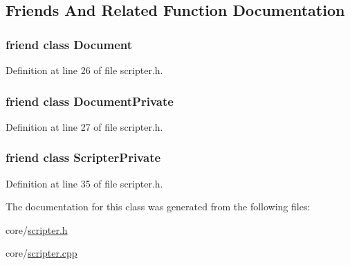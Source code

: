 \subsection{Friends And Related Function Documentation}
\hypertarget{classOkular_1_1Scripter_a883538034e58fc5c0de7d4e4cab3cef7}{
\subsubsection[{Document}]{\setlength{\rightskip}{0pt plus 5cm}friend class {\bf Document}\hspace{0.3cm}{\ttfamily [friend]}}}\label{classOkular_1_1Scripter_a883538034e58fc5c0de7d4e4cab3cef7}


Definition at line 26 of file scripter.\+h.

\hypertarget{classOkular_1_1Scripter_ad60d3d11afe13773e689a27dbaba5d11}{
\subsubsection[{Document\+Private}]{\setlength{\rightskip}{0pt plus 5cm}friend class {\bf Document\+Private}\hspace{0.3cm}{\ttfamily [friend]}}}\label{classOkular_1_1Scripter_ad60d3d11afe13773e689a27dbaba5d11}


Definition at line 27 of file scripter.\+h.

\hypertarget{classOkular_1_1Scripter_a016d502d2a5f11cbf0243d2376e9a1a4}{
\subsubsection[{Scripter\+Private}]{\setlength{\rightskip}{0pt plus 5cm}friend class {\bf Scripter\+Private}\hspace{0.3cm}{\ttfamily [friend]}}}\label{classOkular_1_1Scripter_a016d502d2a5f11cbf0243d2376e9a1a4}


Definition at line 35 of file scripter.\+h.



The documentation for this class was generated from the following files\+:\begin{DoxyCompactItemize}
\item 
core/\hyperlink{scripter_8h}{scripter.\+h}\item 
core/\hyperlink{scripter_8cpp}{scripter.\+cpp}\end{DoxyCompactItemize}
